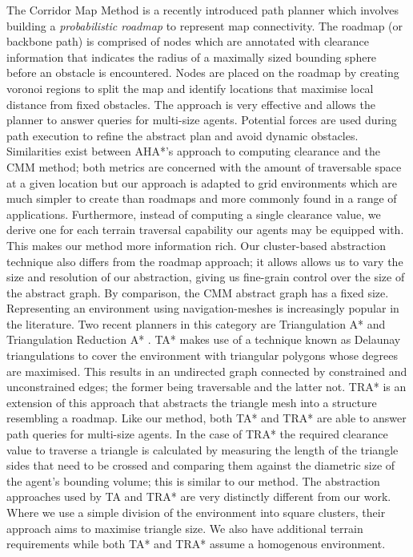 \medskip
The Corridor Map Method \cite{geraerts07} is a recently introduced path planner which involves building a \emph{probabilistic roadmap} to represent map connectivity. 
The roadmap (or backbone path) is comprised of nodes which are annotated with clearance information that indicates the radius of a maximally sized bounding sphere before an obstacle is encountered. Nodes are placed on the roadmap by creating voronoi regions to split the map and identify locations that maximise local distance from fixed obstacles. The approach is very effective and allows the planner to answer queries for multi-size agents. Potential forces are used during path execution to refine the abstract plan and avoid dynamic obstacles. \newline
Similarities exist between AHA*'s approach to computing clearance and the CMM  method; both metrics are concerned with the amount of traversable space at a given location but our approach is adapted to grid environments which are much simpler to create than roadmaps and more commonly found in a range of applications. 
Furthermore, instead of computing a single clearance value, we derive one for each terrain traversal capability our agents may be equipped with. 
This makes our method more information rich. 
Our cluster-based abstraction technique also differs from the roadmap approach; it allows allows us to vary the size and resolution of our abstraction, giving us fine-grain control over the size of the abstract graph. By comparison, the CMM abstract graph has a fixed size.\\
\medskip
Representing an environment using navigation-meshes is increasingly popular in the literature. Two recent planners in this category are Triangulation A* and Triangulation Reduction A* \cite{demyen07}. TA* makes use of a technique known as Delaunay triangulations to cover the environment with triangular polygons whose degrees are maximised. This results in an undirected graph connected by constrained and unconstrained edges; the former being traversable and the latter not. TRA* is an extension of this approach that abstracts the triangle mesh into a structure resembling a roadmap. 
Like our method, both TA* and TRA* are able to answer path queries for multi-size agents. 
In the case of TRA* the required clearance value to traverse a triangle is calculated by measuring the length of the triangle sides that need to be crossed and comparing them against the diametric size of the agent's bounding volume; this is similar to our method. The abstraction approaches used by TA and TRA* are very distinctly different from our work. Where we use a simple division of the environment into square clusters, their approach aims to maximise triangle size. We also have additional terrain requirements while both TA* and TRA* assume a homogenous environment.

